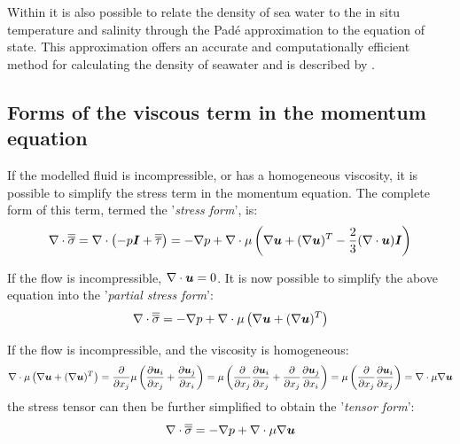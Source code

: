 Within \fluidity it is also possible to relate the density of sea water to the in situ temperature and salinity through the Pad{\'e} approximation to the equation of state. This approximation offers an accurate and computationally efficient method for calculating the density of seawater and is described by \citet{mcdougall2003}.


\subsection{Forms of the viscous term in the momentum equation} \label{sec:ViscosityTerms}

If the modelled fluid is incompressible, or has a homogeneous viscosity, it is possible to simplify the stress term in the momentum equation. The complete form of this term, termed the '\emph{stress form}', is:
\begin{equation}
\nabla\cdot\overline{\overline{\sigma}} = \nabla\cdot\left(-p {\mbox{\boldmath$I$}} + \overline{\overline{\tau}}\right) = - \nabla p +
\nabla\cdot\mu\left(\nabla{\mbox{\boldmath$u$}} + (\nabla{\mbox{\boldmath$u$}})^T - \frac{2}{3}(\nabla\cdot{\mbox{\boldmath$u$}}){\mbox{\boldmath$I$}} \right)
\end{equation}

If the flow is incompressible, $\nabla\cdot{\mbox{\boldmath$u$}}=0$. It is now possible to simplify the above equation into the '\emph{partial stress form}':
\begin{equation}
\nabla\cdot\overline{\overline{\sigma}} = - \nabla p +
\nabla\cdot\mu\left(\nabla{\mbox{\boldmath$u$}} + (\nabla{\mbox{\boldmath$u$}})^T\right)
\end{equation}

If the flow is incompressible, and the viscosity is homogeneous:
\begin{equation}
\nabla\cdot\mu\left(\nabla{\mbox{\boldmath$u$}} + (\nabla{\mbox{\boldmath$u$}})^T\right) = \frac{\partial}{\partial x_j} \mu \left(\frac{\partial {\mbox{\boldmath$u$}}_i}{\partial x_j} + \frac{\partial {\mbox{\boldmath$u$}}_j}{\partial x_i}\right) = \mu \left(\frac{\partial}{\partial x_j}\frac{\partial {\mbox{\boldmath$u$}}_i}{\partial x_j} + \frac{\partial}{\partial x_j}\frac{\partial {\mbox{\boldmath$u$}}_j}{\partial x_i}\right) = \mu \left(\frac{\partial}{\partial x_j}\frac{\partial {\mbox{\boldmath$u$}}_i}{\partial x_j}\right) = \nabla\cdot\mu\nabla{\mbox{\boldmath$u$}}
\end{equation}
the stress tensor can then be further simplified to obtain the '\emph{tensor form}':
\begin{equation}
\nabla\cdot\overline{\overline{\sigma}} = - \nabla p + \nabla\cdot\mu\nabla{\mbox{\boldmath$u$}}
\end{equation}

